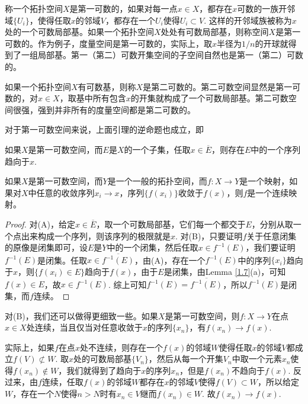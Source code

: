 \begin{para}
	称一个拓扑空间$X$是第一可数的，如果对每一点$x\in X$，都存在$x$可数的一族开邻域$\{U_i\}$，使得任取$x$的邻域$V$，都存在一个$U_i$使得$U_i\subset V$. 这样的开邻域族被称为$x$处的一个可数局部基。如果一个拓扑空间$X$处处有可数局部基，则称空间$X$是第一可数的。作为例子，度量空间是第一可数的，实际上，取$x$半径为$1/n$的开球就得到了一组局部基。第一（第二）可数开集空间的子空间自然也是第一（第二）可数的。

	如果一个拓扑空间$X$有可数基，则称$X$是第二可数的。第二可数空间显然是第一可数的，对$x\in X$，取基中所有包含$x$的开集就构成了一个可数局部基。第二可数空间很强，强到并非所有的度量空间都是第二可数的。

	对于第一可数空间来说，上面引理的逆命题也成立，即
	\begin{compactenum}[~~~(A)]\it 
	\item 如果$X$是第一可数空间，而$E$是$X$的一个子集，任取$x\in \overline{E}$，则存在$E$中的一个序列趋向于$x$.
	\item 如果$X$是第一可数空间，而$Y$是一个一般的拓扑空间，而$f:X\to Y$是一个映射，如果对$X$中任意的收敛序列$x_i\to x$，序列$\{f(x_i)\}$收敛于$f(x)$，则$f$是一个连续映射。
	\end{compactenum}

	\begin{proof}
	对(A)，给定$x\in \overline{E}$，取一个可数局部基，它们每一个都交于$E$，分别从取一个点出来构成一个序列，则该序列的极限就是$x$. 对(B)，只要证明$f$关于任意闭集的原像是闭集即可，设$E$是$Y$中的一个闭集，然后任取$x\in f^{-1}(E)$，我们要证明$f^{-1}(E)$是闭集。任取$x\in \overline{f^{-1}(E)}$，由(A)，存在一个$f^{-1}(E)$中的序列$\{x_i\}$趋向于$x$，则$\{f(x_i)\in E\}$趋向于$f(x)$，由于$E$是闭集，由Lemma \ref{1.7}(a)，可知$f(x)\in E$，故$x\in f^{-1}(E)$. 综上可知$f^{-1}(E)=\overline{f^{-1}(E)}$，所以$f^{-1}(E)$是闭集，而$f$连续。
	\end{proof}

	对(B)，我们还可以做得更细致一些。如果$X$是第一可数空间，则$f:X\to Y$在点$x\in X$处连续，当且仅当对任意收敛于$x$的序列$\{x_n\}$，有$f(x_n)\to f(x)$.

	实际上，如果$f$在点$x$处不连续，则存在一个$f(x)$的邻域$W$使得任取$x$的邻域$V$都成立$f(V)\not\subset W$. 取$x$处的可数局部基$\{V_n\}$，然后从每一个开集$V_n$中取一个元素$x_n$使得$f(x_n)\not\in W$，我们就得到了趋向于$x$的序列$x_n$，但是$f(x_n)$不趋向于$f(x)$. 反过来，由$f$连续，任取$f(x)$的邻域$W$都存在$x$的邻域$V$使得$f(V)\subset W$，所以给定$W$，存在一个$N$使得$n>N$时有$x_n\in V$继而$f(x_n)\in W$. 故$f(x_n)\to f(x)$.
\end{para}

